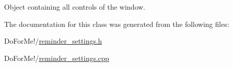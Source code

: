 Object containing all controls of the window. 



The documentation for this class was generated from the following files\-:\begin{DoxyCompactItemize}
\item 
Do\-For\-Me!/\hyperlink{reminder__settings_8h}{reminder\-\_\-settings.\-h}\item 
Do\-For\-Me!/\hyperlink{reminder__settings_8cpp}{reminder\-\_\-settings.\-cpp}\end{DoxyCompactItemize}
